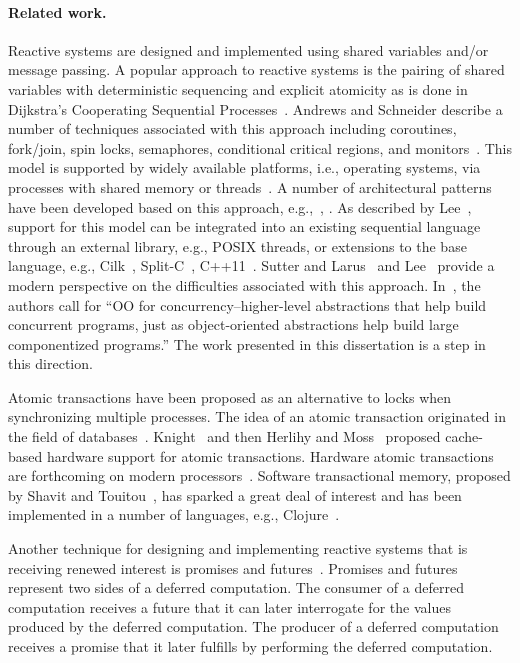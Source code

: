 \paragraph{Related work.}
Reactive systems are designed and implemented using shared variables and/or message passing.
A popular approach to reactive systems is the pairing of shared variables with deterministic sequencing and explicit atomicity as is done in Dijkstra's Cooperating Sequential Processes~\cite{dijkstra1965cooperating}.
Andrews and Schneider describe a number of techniques associated with this approach including coroutines, fork/join, spin locks, semaphores, conditional critical regions, and monitors~\cite{andrews1983concepts}.
This model is supported by widely available platforms, i.e., operating systems, via processes with shared memory or threads~\cite{silberschatz2005operating}.
A number of architectural patterns have been developed based on this approach, e.g.,~\cite{schmidt2000pattern}, \cite{lea2000concurrent}.
As described by Lee~\cite{lee2006problem}, support for this model can be integrated into an existing sequential language through an external library, e.g., POSIX threads, or extensions to the base language, e.g., Cilk~\cite{blumofe1995cilk}, Split-C~\cite{culler1993parallel}, C++11~\cite{cxx11}.
Sutter and Larus~\cite{sutter2005software} and Lee~\cite{lee2006problem} provide a modern perspective on the difficulties associated with this approach.
In~\cite{sutter2005software}, the authors call for ``OO for concurrency--higher-level abstractions that help build concurrent programs, just as object-oriented abstractions help build large componentized programs.''
The work presented in this dissertation is a step in this direction.

Atomic transactions have been proposed as an alternative to locks when synchronizing multiple processes.
The idea of an atomic transaction originated in the field of databases~\cite{Eswaran:1976:NCP:360363.360369}.
Knight~\cite{Knight:1986:AMF:319838.319854} and then Herlihy and Moss~\cite{Herlihy:1993:TMA:165123.165164} proposed cache-based hardware support for atomic transactions.
Hardware atomic transactions are forthcoming on modern processors~\cite{haswell}.
Software transactional memory, proposed by Shavit and Touitou~\cite{shavit1997software}, has sparked a great deal of interest and has been implemented in a number of languages, e.g., Clojure~\cite{halloway2009programming}.

Another technique for designing and implementing reactive systems that is receiving renewed interest is promises and futures~\cite{friedman1976impact, ifip1975new}.
Promises and futures represent two sides of a deferred computation.
The consumer of a deferred computation receives a future that it can later interrogate for the values produced by the deferred computation.
The producer of a deferred computation receives a promise that it later fulfills by performing the deferred computation.

